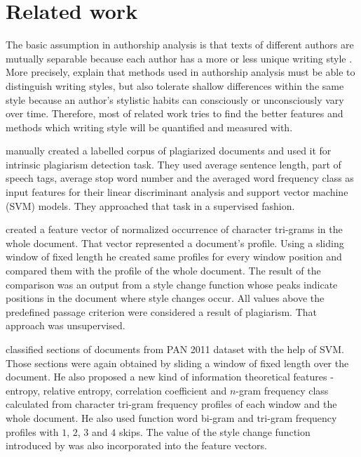 \documentclass[10pt, a4paper]{article}
\begin{document}
\section{Related work}
The basic assumption in authorship analysis is that texts of different authors are mutually separable because each author has a more or less unique writing style \citep{stamatatos-2009a,ding-2016}. More precisely, \citet{koppel-2009} explain that methods used in authorship analysis must be able to distinguish writing styles, but also tolerate shallow differences within the same style because an author's stylistic habits can consciously or unconsciously vary over time. Therefore, most of related work tries to find the better features and methods which writing style will be quantified and measured with.

\citet{zu-2006} manually created a labelled corpus of plagiarized documents and used it for intrinsic plagiarism detection task. They used average sentence length, part of speech tags, average stop word number and the averaged word frequency class as input features for their linear discriminant analysis and support vector machine (SVM) models. They approached that task in a supervised fashion. 

\citet{stamatatos-2009b} created a feature vector of normalized occurrence of character tri-grams in the whole document. That vector represented a document's profile. Using a sliding window of fixed length he created same profiles for every window position and compared them with the profile of the whole document. The result of the comparison was an output from a style change function whose peaks indicate positions in the document where style changes occur. All values above the predefined passage criterion were considered a result of plagiarism. That approach was unsupervised.

\citet{rahman-2015} classified sections of documents from PAN 2011 dataset with the help of SVM. Those sections were again obtained by sliding a window of fixed length over the document. He also proposed a new kind of information theoretical features - entropy, relative entropy, correlation coefficient and $n$-gram frequency class calculated from character tri-gram frequency profiles of each window and the whole document. {{{He also used function word bi-gram and tri-gram frequency profiles with $1$, $2$, $3$ and $4$ skips.}}} The value of the style change function introduced by \citet{stamatatos-2009b} was also incorporated into the feature vectors.
\end{document}
